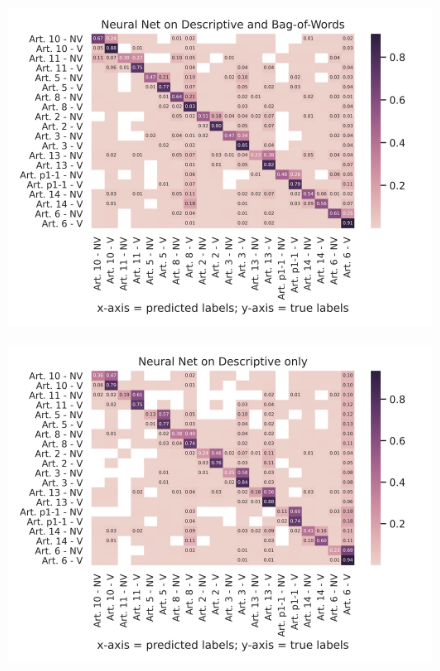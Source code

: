 \documentclass{article}
\begin{document}
\begin{figure}[!htb]
    \centering
    \includegraphics[scale=0.7]{data/analysis/cm/multiclass_cm_test_neural_net_descriptive_and_bag-of-words.png}  
\end{figure}
\begin{figure}[!htb]
    \centering
    \includegraphics[scale=0.7]{data/analysis/cm/multiclass_cm_test_neural_net_descriptive_only.png}  
\end{figure}
\end{document}
